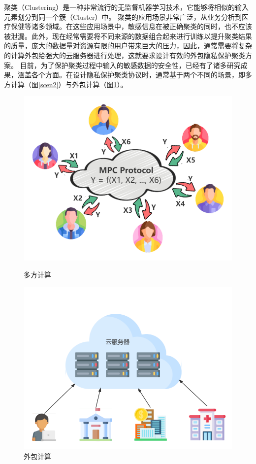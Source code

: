 聚类（Clustering）是一种非常流行的无监督机器学习技术，它能够将相似的输入元素划分到同一个簇（Cluster）中。
聚类的应用场景非常广泛，从业务分析到医疗保健等诸多领域。在这些应用场景中，敏感信息在被正确聚类的同时，也不应该被泄漏。此外，现在经常需要将不同来源的数据组合起来进行训练以提升聚类结果的质量，庞大的数据量对资源有限的用户带来巨大的压力，因此，通常需要将复杂的计算外包给强大的云服务器进行处理，这就要求设计有效的外包隐私保护聚类方案\cite{ahmed2020k}。
目前，为了保护聚类过程中输入的敏感数据的安全性，已经有了诸多研究成果，涵盖各个方面。在设计隐私保护聚类协议时，通常基于两个不同的场景，即多方计算（图\ref{scen2}）与外包计算（图\ref{scen1}）。
\begin{figure}[htbp] %
	\begin{minipage}[t]{0.45\linewidth}
		\includegraphics[width=\linewidth]{img/mpc.png}
		\caption{多方计算}
		\label{scen2}
	\end{minipage}
	\hfill
	\begin{minipage}[t]{0.45\linewidth}
	\includegraphics[width=\linewidth]{img/outsource.png}
	\caption{外包计算}
	\label{scen1}
	\end{minipage}
\end{figure}

